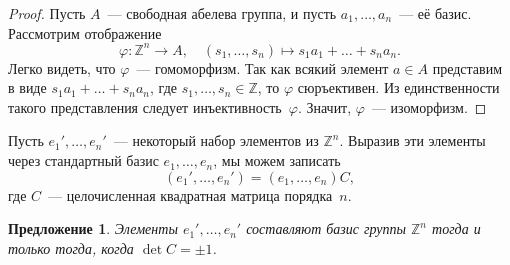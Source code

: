 \documentclass[a4paper, 12pt]{article}
\def\ZZ{{\mathbb Z}}%
\newtheorem{proposition}{Предложение}
\theoremstyle{definition}
\theoremstyle{remark}
\begin{document}
\begin{proof}
Пусть $A$~--- свободная абелева группа, и пусть $a_1,\ldots,a_n$~---
её базис. Рассмотрим отображение
$$\varphi \colon \ZZ^n \to A, \quad (s_1, \ldots, s_n)
\mapsto s_1a_1 + \ldots + s_na_n.
$$
Легко видеть, что $\varphi$~--- гомоморфизм. Так как всякий элемент
$a \in A$ представим в виде $s_1a_1 + \ldots + s_na_n$, где $s_1,
\ldots, s_n \in \ZZ$, то $\varphi$ сюръективен. Из единственности
такого представления следует инъективность~$\varphi$. Значит,
$\varphi$~--- изоморфизм.
\end{proof}

Пусть $e_1', \ldots, e_n'$~--- некоторый набор элементов из $\ZZ^n$.
Выразив эти элементы через стандартный базис $e_1, \ldots, e_n$, мы
можем записать
$$
(e_1', \ldots, e_n') = (e_1, \ldots, e_n)C,
$$
где $C$~--- целочисленная квадратная матрица порядка~$n$.

\begin{proposition}
Элементы $e_1', \ldots, e_n'$ составляют базис группы $\ZZ^n$ тогда
и только тогда, когда $\det C = \pm 1$.
\end{proposition}
\end{document}
